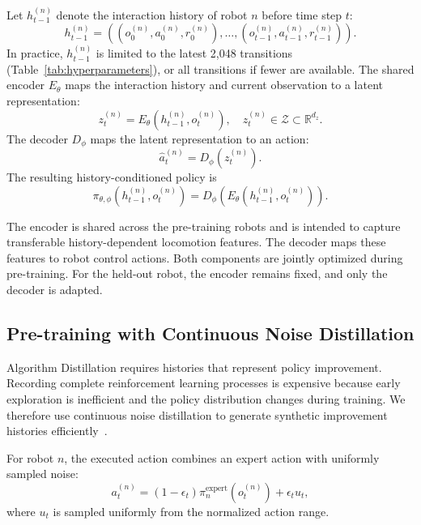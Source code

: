 \documentclass[runningheads]{llncs}
\begin{document}
Let $h_{t-1}^{(n)}$ denote the interaction history of robot $n$ before time step $t$:
\begin{equation}
h_{t-1}^{(n)}
=
\left(
(o_0^{(n)},a_0^{(n)},r_0^{(n)}),
\ldots,
(o_{t-1}^{(n)},a_{t-1}^{(n)},r_{t-1}^{(n)})
\right).
\label{eq:history_def}
\end{equation}
In practice, $h_{t-1}^{(n)}$ is limited to the latest 2,048 transitions (Table~\ref{tab:hyperparameters}), or all transitions if fewer are available.
The shared encoder $E_\theta$ maps the interaction history and current observation to a latent representation:
\begin{equation}
z_t^{(n)}=E_\theta
(h_{t-1}^{(n)},o_t^{(n)}),
\quad
z_t^{(n)}\in\mathcal{Z}\subset\mathbb{R}^{d_z}.
\label{eq:latent_representation}
\end{equation}
The decoder $D_\phi$ maps the latent representation to an action:
\begin{equation}
\hat{a}_t^{(n)}=D_\phi(z_t^{(n)}).
\label{eq:decoder_mapping}
\end{equation}
The resulting history-conditioned policy is
\begin{equation}
\label{eq:policy_comp}
\pi_{\theta,\phi}(h_{t-1}^{(n)},o_t^{(n)})
=D_\phi(E_\theta(h_{t-1}^{(n)},o_t^{(n)})).
\end{equation}

The encoder is shared across the pre-training robots and is intended to capture transferable history-dependent locomotion features.
The decoder maps these features to robot control actions.
Both components are jointly optimized during pre-training.
For the held-out robot, the encoder remains fixed, and only the decoder is adapted.



\subsection{Pre-training with Continuous Noise Distillation}

Algorithm Distillation requires histories that represent policy improvement.
Recording complete reinforcement learning processes is expensive because early exploration is inefficient and the policy distribution changes during training.
We therefore use continuous noise distillation to generate synthetic improvement histories efficiently~\cite{zisman2024emergenceincontextreinforcementlearning,polubarov2025vintixactionmodelincontext}.

For robot $n$, the executed action combines an expert action with uniformly sampled noise:
\begin{equation}
a_t^{(n)}=(1-\epsilon_t)
\pi_n^{\mathrm{expert}}(o_t^{(n)})
+
\epsilon_t u_t,
\end{equation}
where $u_t$ is sampled uniformly from the normalized action range.
\end{document}
